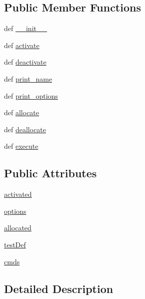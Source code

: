\subsection*{Public Member Functions}
\begin{DoxyCompactItemize}
\item 
def \hyperlink{class_shell_1_1_shell_a36cee8fc1bc0b3444cc672f5b66c0708}{\-\_\-\-\_\-init\-\_\-\-\_\-}
\item 
def \hyperlink{class_shell_1_1_shell_a043911923f93dbf079dd559bb11843d0}{activate}
\item 
def \hyperlink{class_shell_1_1_shell_af706278120f05ee7bdc82cc1a19becb2}{deactivate}
\item 
def \hyperlink{class_shell_1_1_shell_a95d4da6fd233685f5ecbe7837dbc35ac}{print\-\_\-name}
\item 
def \hyperlink{class_shell_1_1_shell_a7530d09d0ec49e48665d34c4dd5d7dfa}{print\-\_\-options}
\item 
def \hyperlink{class_shell_1_1_shell_aaea88fad0ba8f7bf1da2fc113021add9}{allocate}
\item 
def \hyperlink{class_shell_1_1_shell_ad0d25de668c93990107294a472b80737}{deallocate}
\item 
def \hyperlink{class_shell_1_1_shell_a64c0f9c5cfbea625d0a3323a8b7c0f39}{execute}
\end{DoxyCompactItemize}
\subsection*{Public Attributes}
\begin{DoxyCompactItemize}
\item 
\hyperlink{class_shell_1_1_shell_a5869d648354d59617e4a9836ef0c4ba3}{activated}
\item 
\hyperlink{class_shell_1_1_shell_a3e2a9754ac3fa0e2a00c5f0861ef85f2}{options}
\item 
\hyperlink{class_shell_1_1_shell_a7d3526fa682799bd7be51fa09c2c9017}{allocated}
\item 
\hyperlink{class_shell_1_1_shell_ac2533422279cd3b3d3bc43e8b3de1301}{test\-Def}
\item 
\hyperlink{class_shell_1_1_shell_abe2dca7284b995f29494ae5e2ea975a7}{cmds}
\end{DoxyCompactItemize}


\subsection{Detailed Description}


